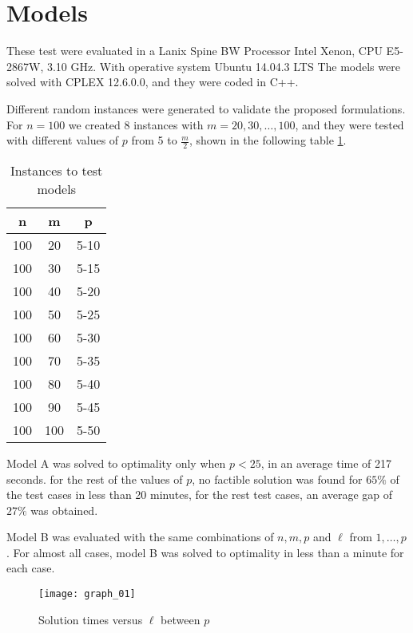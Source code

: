 \section{Models}
%

These test were evaluated in
a Lanix Spine BW Processor Intel Xenon,
CPU E5-2867W, 3.10 GHz.
With operative system Ubuntu 14.04.3 LTS
The models were solved with CPLEX 12.6.0.0,
and they were coded in C++.

Different random instances were generated
to validate the proposed formulations.
For $n = 100$ we created 8 instances with $m = 20,30,\ldots,100$,
and they were tested with different values of $p$ from 5 to $\frac{m}{2}$,
shown in the following table \ref{tab:tests}.
\begin{table}
  \centering
  \begin{tabular}{|c|c|c|}\hline
    n & m & p \\ \hline
    100 & 20 & 5-10 \\
    100 & 30 & 5-15 \\
    100 & 40 & 5-20 \\
    100 & 50 & 5-25 \\
    100 & 60 & 5-30 \\
    100 & 70 & 5-35 \\
    100 & 80 & 5-40 \\
    100 & 90 & 5-45 \\
    100 & 100 & 5-50 \\
    \hline
  \end{tabular}
  \caption{Instances to test models}
  \label{tab:tests}
\end{table}

Model A was solved to optimality only when $p < 25$,
in an average time of 217 seconds.
for the rest of the values of $p$, 
no factible solution was found for $65\%$ of the test cases
in less than 20 minutes,
for the rest test cases,
an average gap of $27\%$ was obtained.

Model B was evaluated
with the same combinations of $n,m,p$
and $\ell$ from $1,\ldots,p$.
For almost all cases,
model B was solved to optimality
in less than a minute for each case.
\begin{figure}[!ht]
  \centering
  \texttt{[image: graph\_01]}
  \caption{Solution times versus $\ell$ between $p$}
\end{figure}

